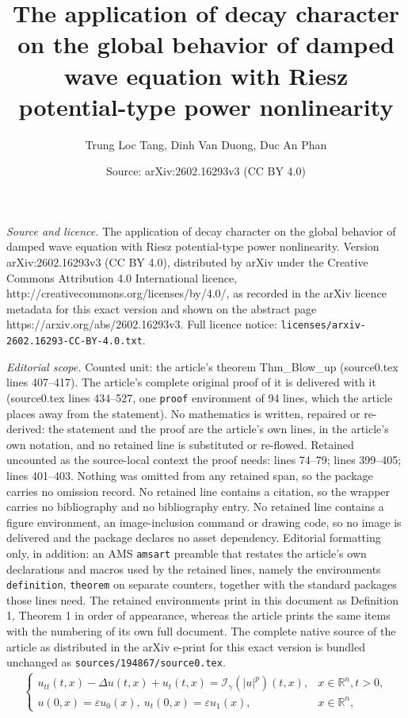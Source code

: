\documentclass[10pt,a4paper]{amsart}
\title{The application of decay character on the global behavior of damped wave equation with Riesz potential-type power nonlinearity}
\author{Trung Loc Tang, Dinh Van Duong, Duc An Phan}
\date{Source: arXiv:2602.16293v3 (CC BY 4.0)}
\begin{document}
\maketitle

\noindent\emph{Source and licence.} The application of decay character on the global behavior of damped wave equation with Riesz potential-type power nonlinearity. Version arXiv:2602.16293v3 (CC BY 4.0), distributed by arXiv under the Creative Commons Attribution 4.0 International licence, http://creativecommons.org/licenses/by/4.0/, as recorded in the arXiv licence metadata for this exact version and shown on the abstract page https://arxiv.org/abs/2602.16293v3. Full licence notice: \texttt{licenses/arxiv-2602.16293-CC-BY-4.0.txt}.\par\smallskip

\noindent\textit{Editorial scope.} Counted unit: the article's theorem Thm\_Blow\_up (source0.tex lines 407--417). The article's complete original proof of it is delivered with it (source0.tex lines 434--527, one \texttt{proof} environment of 94 lines, which the article places away from the statement). No mathematics is written, repaired or re-derived: the statement and the proof are the article's own lines, in the article's own notation, and no retained line is substituted or re-flowed.  Retained uncounted as the source-local context the proof needs: lines 74--79; lines 399--405; lines 401--403.  Nothing was omitted from any retained span, so the package carries no omission record.  No retained line contains a citation, so the wrapper carries no bibliography and no bibliography entry.  No retained line contains a figure environment, an image-inclusion command or drawing code, so no image is delivered and the package declares no asset dependency.  Editorial formatting only, in addition: an AMS \texttt{amsart} preamble that restates the article's own declarations and macros used by the retained lines, namely the environments \texttt{definition}, \texttt{theorem} on separate counters, together with the standard packages those lines need.  The retained environments print in this document as Definition 1, Theorem 1 in order of appearance, whereas the article prints the same items with the numbering of its own full document.  The complete native source of the article as distributed in the arXiv e-print for this exact version is bundled unchanged as \texttt{sources/194867/source0.tex}.
\begin{align}\label{Semilinear_Damped_Waves}
\begin{cases}
u_{tt}(t,x)-\Delta u(t,x)+u_t(t,x)=\mathcal{I}_\gamma(|u|^p)(t,x), &x\in \mathbb{R}^n, t>0,\\
u(0,x)=\varepsilon u_0(x),\ u_t(0,x)=\varepsilon u_1(x),&x\in \mathbb{R}^n,
\end{cases}
\end{align}
\end{document}
